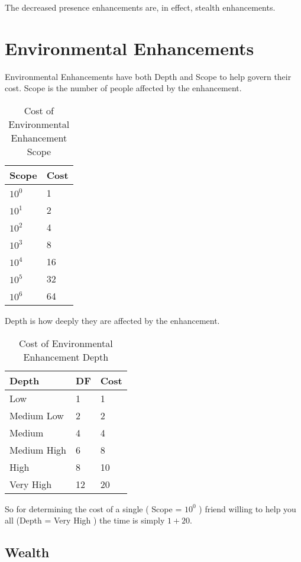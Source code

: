 The decreased presence enhancements are, in effect, stealth enhancements.

\section{Environmental Enhancements}

Environmental Enhancements have both Depth and Scope to help govern
their cost. Scope is the number of people affected by the enhancement.

\begin{table}\label{Table:EnvironmentalEnhancementScopeCosts}
	\begin{tabular}{ll}
    Scope & Cost \\
\hline
	$ 10^0 $  & 1 \\
	$ 10^1 $  & 2 \\
	$ 10^2 $  & 4 \\
	$ 10^3 $  & 8 \\
	$ 10^4 $  & 16 \\
	$ 10^5 $  & 32 \\
	$ 10^6 $  & 64 \\	
	\end{tabular}
    \caption{Cost of Environmental Enhancement Scope}
\end{table}

Depth is how deeply they are affected by the enhancement.

\begin{table}\label{Table:EnvironmentalEnhancementDepthCosts}
	\begin{tabular}{lll}
    Depth & DF & Cost \\
\hline
	Low         & 1 & 1 \\
	Medium Low  & 2 & 2 \\
	Medium      & 4 & 4 \\
	Medium High & 6 & 8 \\
	High        & 8 & 10 \\
	Very High   & 12 & 20 \\
	\end{tabular}
    \caption{Cost of Environmental Enhancement Depth}
\end{table}

So for determining the cost of a single ( Scope = $ 10^0$ ) friend willing to help you all (Depth = Very High ) the
time is simply $ 1 + 20 $.

\subsection{Wealth}

